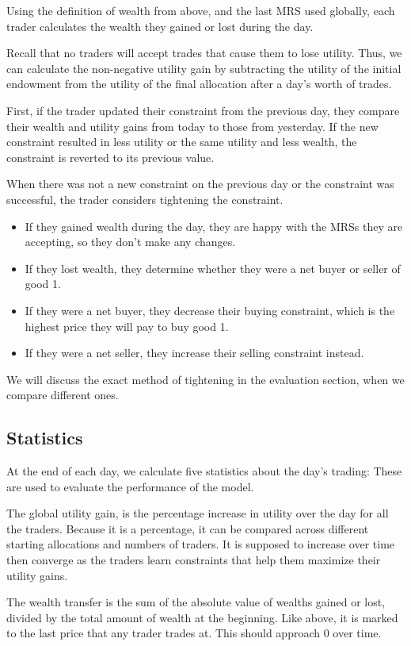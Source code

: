 \documentclass[12pt,a4paper,titlepage]{article}
\begin{document}
Using the definition of wealth from above, and the last MRS used globally, each trader calculates the wealth they gained or lost during the day.

Recall that no traders will accept trades that cause them to lose utility. 
Thus, we can calculate the non-negative utility gain by subtracting the utility of the initial endowment from the utility of the final allocation after a day's worth of trades.

First, if the trader updated their constraint from the previous day, they compare their wealth and utility gains from today to those from yesterday.
If the new constraint resulted in less utility or the same utility and less wealth, the constraint is reverted to its previous value.

When there was not a new constraint on the previous day or the constraint was successful, the trader considers tightening the constraint.
\begin{itemize}
  \item If they gained wealth during the day, they are happy with the MRSs they are accepting, so they don't make any changes.
  \item If they lost wealth, they determine whether they were a net buyer or seller of good 1.
  \item If they were a net buyer, they decrease their buying constraint, which is the highest price they will pay to buy good 1.
  \item If they were a net seller, they increase their selling constraint instead.
\end{itemize}
We will discuss the exact method of tightening in the evaluation section, when we compare different ones.

\subsection{Statistics}
At the end of each day, we calculate five statistics about the day's trading: These are used to evaluate the performance of the model.

The global utility gain, is the percentage increase in utility over the day for all the traders. 
Because it is a percentage, it can be compared across different starting allocations and numbers of traders.
It is supposed to increase over time then converge as the traders learn constraints that help them maximize their utility gains.

The wealth transfer is the sum of the absolute value of wealths gained or lost, divided by the total amount of wealth at the beginning.
Like above, it is marked to the last price that any trader trades at.
This should approach 0 over time.
\end{document}
